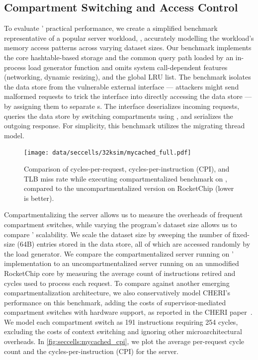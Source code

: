 \subsection{Compartment Switching and Access Control}
\label{sec:seccells:evaluation:memcached}
To evaluate \seccells' practical performance, we create a simplified 
benchmark representative of a popular server workload, 
, accurately modelling the workload's memory access 
patterns across varying dataset sizes.
Our benchmark implements the core hashtable-based storage and the 
common query path loaded by an in-process load generator function
and omits system call-dependent features (networking, dynamic resizing),
and the global LRU list.
The benchmark isolates the data store from the vulnerable external interface
--- attackers might send malformed requests to trick the interface into directly
accessing the data store ---
by assigning them to separate \secdiv{}s.
The interface deserializes incoming requests, queries the data store
by switching compartments using \sdswitch, and serializes the
outgoing response.
For simplicity, this benchmark utilizes the migrating thread model.

\begin{figure}
  \centering
  \texttt{[image: data/seccells/32ksim/mycached\_full.pdf]}
  \caption[\seccells performance comparison: ]
          {Comparison of cycles-per-request,   
          cycles-per-instruction (CPI), and
          TLB miss rate
          while executing compartmentalized  benchmark on 
          \seccells, compared to the uncompartmentalized version on RocketChip
          (lower is better).
          }
  \label{fig:seccells:mycached_cpi}
\end{figure}

Compartmentalizing the server allows us to measure the overheads
of frequent compartment switches, while varying the program's
dataset size allows us to compare \seccells' scalability.
We scale the dataset size by sweeping the number of fixed-size (64B)
entries stored in the data store, all of which are accessed randomly
by the load generator.
We compare the compartmentalized server running on \seccells'
implementation to an uncompartmentalized server running on
an unmodified RocketChip core by measuring the average count of
instructions retired and cycles used to process each request.
To compare against another emerging compartmentalization architecture,
we also conservatively model CHERI's performance on this benchmark,
adding the costs of supervisor-mediated compartment
switches with hardware support, as reported in the 
CHERI paper~\cite{WatsonWNMACDDGL15}.
We model each compartment switch as 191 instructions requiring 254 cycles,
excluding the costs of context switching and
ignoring other microarchitectural overheads.
In \autoref{fig:seccells:mycached_cpi}, we plot the average per-request 
cycle count and the cycles-per-instruction (CPI) for the server.

